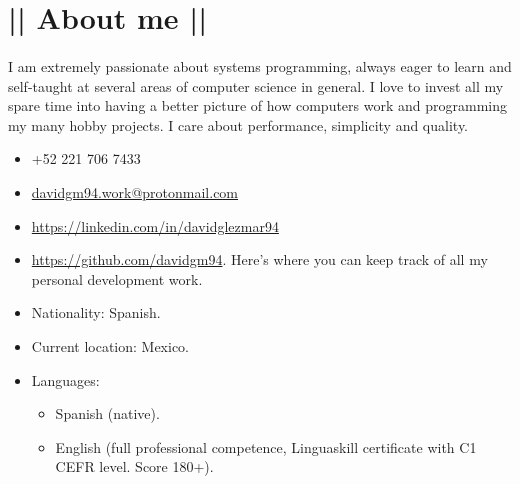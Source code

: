 \section*{|| About me ||}
\paragraph{}I am extremely passionate about systems programming, always eager to learn and self-taught at several areas of computer science in general. I love to invest all my spare time into having a better picture of how computers work and programming my many hobby projects. I care about performance, simplicity and quality.

\begin{itemize}
	\item[] \faPhone \space +52 221 706 7433
	\item[] \faMailReply \space \href{mailto:davidgm94.work@protonmail.com}{davidgm94.work@protonmail.com}
	\item[] \faLinkedin \space \href{https://linkedin.com/in/davidglezmar94}{https://linkedin.com/in/davidglezmar94}
	\item[] \faGithub \space \href{https://github.com/davidgm94}{https://github.com/davidgm94}. Here's where you can keep track of all my personal development work.
	\item[] Nationality: Spanish.
	\item[] Current location: Mexico.
	\item[] Languages:
	\begin{itemize}
		\item Spanish (native).
		\item English (full professional competence, Linguaskill certificate with C1 CEFR level. Score 180+).
	\end{itemize}
\end{itemize}
